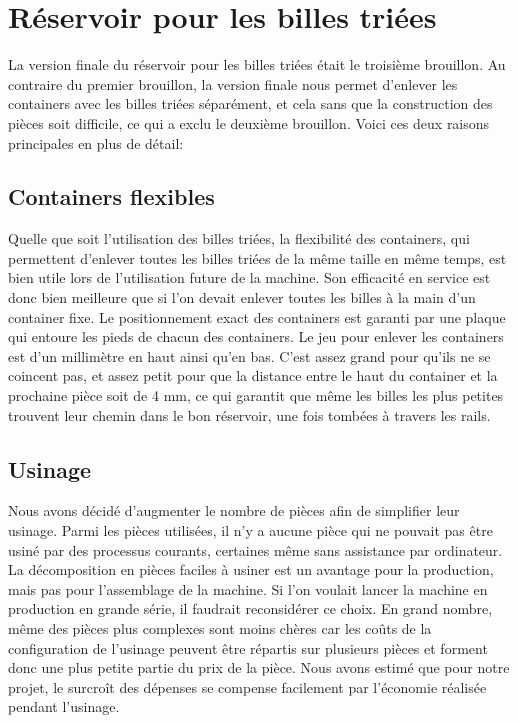 \section{Réservoir pour les billes triées}
La version finale du réservoir pour les billes triées était le troisième brouillon. Au contraire du premier brouillon, la version finale nous permet d'enlever les containers avec les billes triées séparément, et cela sans que la construction des pièces soit difficile, ce qui a exclu le deuxième brouillon. Voici ces deux raisons principales en plus de détail:

\subsection{Containers flexibles}
Quelle que soit l'utilisation des billes triées, la flexibilité des containers, qui permettent d'enlever toutes les billes triées de la même taille en même temps, est bien utile lors de l'utilisation future de la machine. Son efficacité en service est donc bien meilleure que si l'on devait enlever toutes les billes à la main d'un container fixe. Le positionnement exact des containers est garanti par une plaque %
qui entoure les pieds de chacun des containers. Le jeu pour enlever les containers est d'un millimètre en haut ainsi qu'en bas. C'est assez grand pour qu'ils ne se coincent pas, et assez petit pour que la distance entre le haut du container et la prochaine pièce soit de 4 mm, ce qui garantit que même les billes les plus petites trouvent leur chemin dans le bon réservoir, une fois tombées à travers les rails.

\subsection{Usinage}
Nous avons décidé d'augmenter le nombre de pièces afin de simplifier leur usinage. Parmi les pièces utilisées, il n'y a aucune pièce qui ne pouvait pas être usiné par des processus courants, certaines même sans assistance par ordinateur. La décomposition en pièces faciles à usiner est un avantage pour la production, mais pas pour l'assemblage de la machine. Si l'on voulait lancer la machine en production en grande série, il faudrait reconsidérer ce choix. En grand nombre, même des pièces plus complexes sont moins chères car les coûts de la configuration de l'usinage peuvent être répartis sur plusieurs pièces et forment donc une plus petite partie du prix de la pièce. Nous avons estimé que pour notre projet, le surcroît des dépenses se compense facilement par l'économie réalisée pendant l'usinage.

